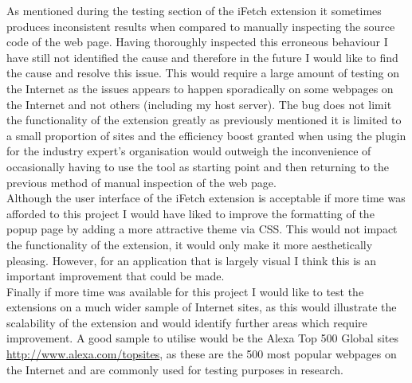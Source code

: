 \documentclass[12pt]{article}
\begin{document}
As mentioned during the testing section of the iFetch extension it sometimes produces inconsistent results when compared to manually inspecting the source code of the web page. Having thoroughly inspected this erroneous behaviour I have still not identified the cause and therefore in the future I would like to find the cause and resolve this issue. This would require a large amount of testing on the Internet as the issues appears to happen sporadically on some webpages on the Internet and not others (including my host server). The bug does not limit the functionality of the extension greatly as previously mentioned it is limited to a small proportion of sites and the efficiency boost granted when using the plugin for the industry expert's organisation would outweigh the inconvenience of occasionally having to use the tool as starting point and then returning to the previous method of manual inspection of the web page. \\  

Although the user interface of the iFetch extension is acceptable if more time was afforded to this project I would have liked to improve the formatting of the popup page by adding a more attractive theme via CSS. This would not impact the functionality of the extension, it would only make it more aesthetically pleasing. However, for an application that is largely visual I think this is an important improvement that could be made. \\

Finally if more time was available for this project I would like to test the extensions on a much wider sample of Internet sites, as this would illustrate the scalability of the extension and would identify further areas which require improvement. A good sample to utilise would be the Alexa Top 500 Global sites \url{http://www.alexa.com/topsites}, as these are the 500 most popular webpages on the Internet and are commonly used for testing purposes in research.  

\pagebreak
\end{document}
